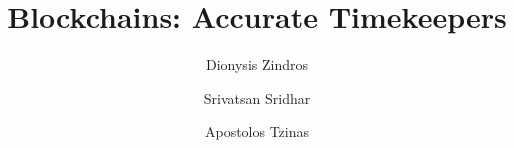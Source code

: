 \title{Blockchains: Accurate Timekeepers}
\ifanonymous{\iflncs
\author{}\institute{}
\fi}
\else
\author{
        Dionysis Zindros \and
        Srivatsan Sridhar  \and
        Apostolos Tzinas
}
